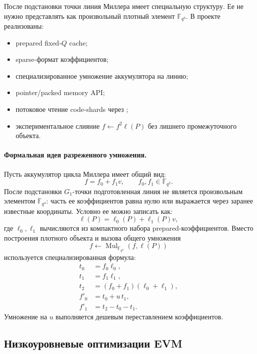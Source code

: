 \documentclass[12pt,a4paper]{article}
\newcommand{\code}[1]{\texttt{\detokenize{#1}}}
\begin{document}
После подстановки точки линия Миллера имеет специальную структуру. Ее не нужно
представлять как произвольный плотный элемент $\mathbb{F}_{q^4}$. В проекте
реализованы:
\begin{itemize}
    \item prepared fixed-$Q$ cache;
    \item sparse-формат коэффициентов;
    \item специализированное умножение аккумулятора на линию;
    \item pointer/packed memory API;
    \item потоковое чтение code-shards через \code{EXTCODECOPY};
    \item экспериментальное слияние $f\leftarrow f^2\ell(P)$ без лишнего
    промежуточного объекта.
\end{itemize}

\paragraph{Формальная идея разреженного умножения.}
Пусть аккумулятор цикла Миллера имеет общий вид:
\[
    f=f_0+f_1v,\qquad f_0,f_1\in\mathbb{F}_{q^2}.
\]
После подстановки $G_1$-точки подготовленная линия не является произвольным
элементом $\mathbb{F}_{q^4}$: часть ее коэффициентов равна нулю или выражается
через заранее известные координаты. Условно ее можно записать как:
\[
    \ell(P)=\ell_0(P)+\ell_1(P)v,
\]
где $\ell_0,\ell_1$ вычисляются из компактного набора prepared-коэффициентов.
Вместо построения плотного объекта и вызова общего умножения
\[
    f\leftarrow\operatorname{Mul}_{\mathbb{F}_{q^4}}(f,\ell(P))
\]
используется специализированная формула:
\[
\begin{aligned}
    t_0&=f_0\ell_0,\\
    t_1&=f_1\ell_1,\\
    t_2&=(f_0+f_1)(\ell_0+\ell_1),\\
    f'_0&=t_0+u\,t_1,\\
    f'_1&=t_2-t_0-t_1.
\end{aligned}
\]
Умножение на $u$ выполняется дешевым переставлением коэффициентов. 

\subsection{Низкоуровневые оптимизации EVM}
\end{document}
